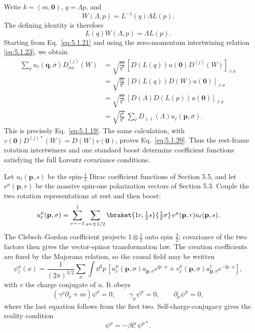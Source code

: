 \ExerciseEditorialNote

\begin{enumerate}
Write \(k=(m,\mathbf0)\), \(q=\Lambda p\), and
\[
 W(\Lambda,p)=L^{-1}(q)\Lambda L(p).
\]
The defining identity is therefore
\[
 L(q)W(\Lambda,p)=\Lambda L(p).
\]
Starting from Eq.~\eqref{eq:5.1.21} and using the zero-momentum
intertwining relation \eqref{eq:5.1.23}, we obtain
\[
\begin{split}
 \sum_{\bar\sigma}u_\ell(\mathbf q,\bar\sigma)
 D^{(j)}_{\bar\sigma\sigma}(W)
 &=
 \sqrt{\frac{m}{q^0}}\,
 \left[D(L(q))u(\mathbf0)D^{(j)}(W)\right]_{\ell\sigma}\\
 &=
 \sqrt{\frac{m}{q^0}}\,
 \left[D(L(q))D(W)u(\mathbf0)\right]_{\ell\sigma}\\
 &=
 \sqrt{\frac{m}{q^0}}\,
 \left[D(\Lambda)D(L(p))u(\mathbf0)\right]_{\ell\sigma}\\
 &=
 \sqrt{\frac{p^0}{q^0}}\,
 \sum_{\bar\ell}D_{\ell\bar\ell}(\Lambda)
 u_{\bar\ell}(\mathbf p,\sigma).
\end{split}
\]
This is precisely Eq.~\eqref{eq:5.1.19}.  The same calculation, with
\(v(\mathbf0)D^{(j)*}(W)=D(W)v(\mathbf0)\), proves
Eq.~\eqref{eq:5.1.20}.  Thus the rest-frame rotation intertwiners and one
standard boost determine coefficient functions satisfying the full Lorentz
covariance conditions.

Let \(u_\ell(\mathbf p,s)\) be the spin-\(\tfrac12\) Dirac coefficient
functions of Section 5.5, and let \(e^\mu(\mathbf p,r)\) be the massive
spin-one polarization vectors of Section 5.3.  Couple the two rotation
representations at rest and then boost:
\[
 u_\ell^\mu(\mathbf p,\sigma)=
 \sum_{r=-1}^{1}\sum_{s=\pm1/2}
 \braket{1r,\tfrac12s}{\tfrac32\sigma}\,
 e^\mu(\mathbf p,r)u_\ell(\mathbf p,s).
\]
The Clebsch--Gordan coefficient projects \(1\otimes\tfrac12\) onto
spin \(\tfrac32\); covariance of the two factors then gives the vector-spinor
transformation law.  The creation coefficients are fixed by the Majorana
relation, so the causal field may be written
\[
 \psi^\mu_\ell(x)=\frac1{(2\pi)^{3/2}}\sum_\sigma\int \dd^3p\,
 \left[u^\mu_\ell(\mathbf p,\sigma)a_{\mathbf p,\sigma}e^{\ii p\cdot x}
 {}+v^\mu_\ell(\mathbf p,\sigma)a^\dagger_{\mathbf p,\sigma}e^{-\ii p\cdot x}\right],
\]
with \(v\) the charge conjugate of \(u\).  It obeys
\[
 (\gamma^\rho\partial_\rho+m)\psi^\mu=0,\qquad
 \gamma_\mu\psi^\mu=0,\qquad
 \partial_\mu\psi^\mu=0,
\]
where the last equation follows from the first two.  Self-charge-conjugacy
gives the reality condition
\[
 \psi^\mu=-\beta\mathcal C\,\psi^{\mu *}.
\]


\end{enumerate}
